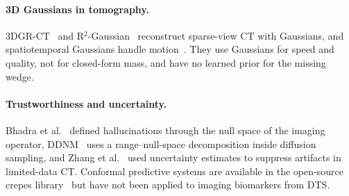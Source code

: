 \paragraph{3D Gaussians in tomography.} 3DGR-CT~\cite{li2025gr} and R$^2$-Gaussian~\cite{zha2024r2} reconstruct sparse-view CT with Gaussians, and spatiotemporal Gaussians handle motion~\cite{xie2025pmf,liu2025fmgs}. They use Gaussians for speed and quality, not for closed-form mass, and have no learned prior for the missing wedge.

\paragraph{Trustworthiness and uncertainty.} Bhadra et al.~\cite{bhadra2021} defined hallucinations through the null space of the imaging operator, DDNM~\cite{wang2023ddnm} uses a range--null-space decomposition inside diffusion sampling, and Zhang et al.~\cite{zhang2025pail} used uncertainty estimates to suppress artifacts in limited-data CT. Conformal predictive systems are available in the open-source crepes library~\cite{bostrom2022crepes} but have not been applied to imaging biomarkers from DTS.


